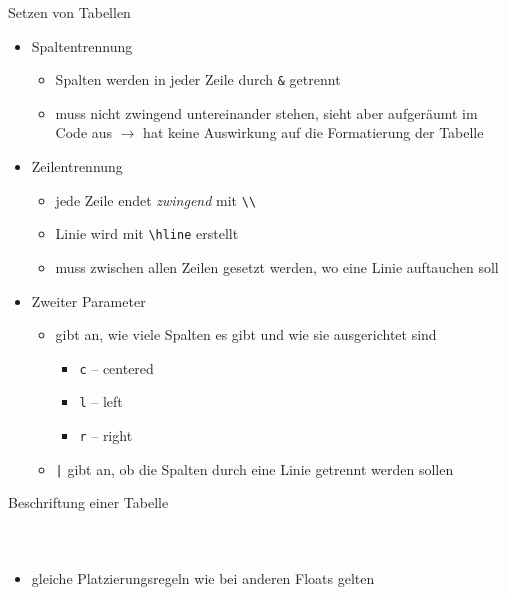 \documentclass[presentation,aspectratio=169]{beamer}
\begin{document}
\begin{frame}[fragile]{Setzen von Tabellen}
  \begin{itemize}
    \item Spaltentrennung
      \begin{itemize}
        \item Spalten werden in jeder Zeile durch \verb|&| getrennt
        \item muss nicht zwingend untereinander stehen, sieht aber aufgeräumt im Code aus $\rightarrow$ hat keine Auswirkung auf die Formatierung der Tabelle
      \end{itemize}
    \item Zeilentrennung
      \begin{itemize}
        \item jede Zeile endet \emph{zwingend} mit \verb|\\|
        \item Linie wird mit \verb|\hline| erstellt
        \item muss zwischen allen Zeilen gesetzt werden, wo eine Linie auftauchen soll
      \end{itemize}
    \item Zweiter Parameter
      \begin{itemize}
        \item gibt an, wie viele Spalten es gibt und wie sie ausgerichtet sind
          \begin{itemize}
            \item \verb|c| -- centered
            \item \verb|l| -- left
            \item \verb|r| -- right
          \end{itemize}
        \item \verb/|/ gibt an, ob die Spalten durch eine Linie getrennt werden sollen
      \end{itemize}
  \end{itemize}
\end{frame}

\begin{frame}[fragile]{Beschriftung einer Tabelle}
  \begin{columns}
    \begin{column}{.45\textwidth}
      
    \end{column}
    \begin{column}{.5\textwidth}
      \inputminted{latex}{codebeispiele/table-float.tex}
    \end{column}
  \end{columns}
  \vspace{1em}
  \begin{itemize}
    \centering
    \item gleiche Platzierungsregeln wie bei anderen Floats gelten
  \end{itemize}
\end{frame}
\end{document}

